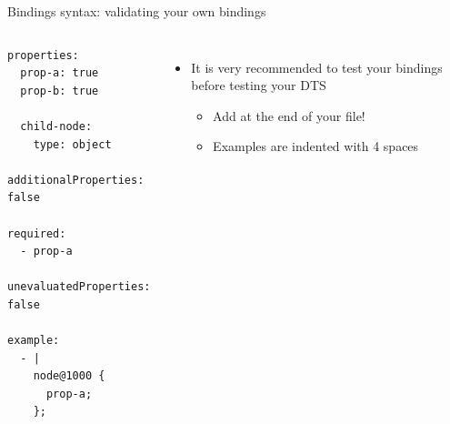 \begin{frame}[fragile]{Bindings syntax: validating your own bindings}
  \begin{columns}
    \begin{block}{}
      {\fontsize{5}{6}\selectfont
\begin{verbatim}
properties:
  prop-a: true
  prop-b: true

  child-node:
    type: object
    additionalProperties: false

required:
  - prop-a

unevaluatedProperties: false

example:
  - |
    node@1000 {
      prop-a;
    };
\end{verbatim}
      }
    \end{block}
    \begin{itemize}
    \item It is very recommended to test your bindings before testing
      your DTS
      \begin{itemize}
      \item Add  at the end of your file!
      \item Examples are indented with 4 spaces
      \end{itemize}
    \end{itemize}
  \end{columns}
\end{frame}

